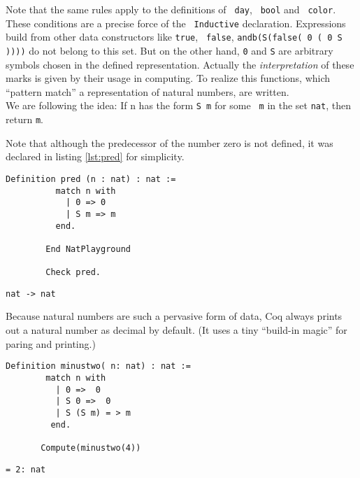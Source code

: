 	  Note that the same rules apply to the definitions of \lstinline! day!, \lstinline! bool! and \lstinline! color!.
	  These conditions are a precise force of the \lstinline! Inductive! declaration. 
	  Expressions build from other data constructors like \lstinline!true!, \lstinline! false!, \lstinline!andb(S(false( 0 ( 0 S ))))! do not belong to this set.  
	  But on the other hand, \lstinline!0! and \lstinline!S! are arbitrary symbols chosen in the defined representation. 
	  Actually the {\itshape interpretation} of these marks is given by their usage in computing.
	  To realize this functions, which ``pattern match'' a representation of natural numbers, are written.\\  
	  We are following the idea:  If n has the form \lstinline!S m! for some \lstinline! m! in the set \lstinline!nat!, then return  \lstinline!m!.
	  \begin{example}%
	   {\normalfont 
	   Note that although the predecessor of the number zero is not defined, it was declared in listing \ref{lst:pred} for simplicity.    
	  
	   \begin{minipage}[t]{0.45\textwidth}
	   \begin{lstlisting}[caption= \lstinline!pred!, label =lst:pred]
	  	Definition pred (n : nat) : nat := 
	  	  match n with 
	   	    | 0 => 0
	   	    | S m => m
	   	  end. 
	   	  
	    End NatPlayground
	   	 
	    Check pred. 
	    \end{lstlisting}
	    \end{minipage}
	    \hfill
	    \begin{minipage}[t]{0.45\textwidth}
	    \begin{lstlisting}[caption= Coq-output]
	     nat -> nat    
	    \end{lstlisting}
	    \end{minipage}
	   
	    
	  \normalfont }
	  \end{example}
	  
	  Because natural numbers are such a pervasive form of data, Coq always prints out a natural number as decimal by default.
	  (It uses a tiny ``build-in magic'' for paring and printing.)
	 
	  \begin{minipage}[t]{0.50\textwidth}
	  \begin{lstlisting}[caption= \lstinline! minustwo!]
	   Definition minustwo( n: nat) : nat :=
	    match n with
	      | 0 =>  0
	      | S 0 =>  0
	      | S (S m) = > m
	     end.
	     
	   Compute(minustwo(4))
	   \end{lstlisting} 
	   \end{minipage} 
	   \hfill     
	  \begin{minipage}[t]{0.45\textwidth}
	  \begin{lstlisting}[caption = Coq-output] 
	    = 2: nat 
	   \end{lstlisting}
	   \end{minipage}     
	      
